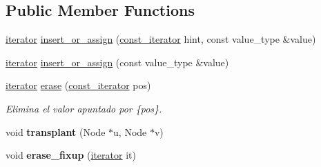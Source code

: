 \subsection*{\-Public \-Member \-Functions}
\begin{DoxyCompactItemize}
\item 
\hyperlink{classaed2_1_1map_1_1iterator}{iterator} \hyperlink{classaed2_1_1map_a2ef6723c183916276b0afc4a4c721475}{insert\-\_\-or\-\_\-assign} (\hyperlink{classaed2_1_1map_1_1const__iterator}{const\-\_\-iterator} hint, const value\-\_\-type \&value)
\item 
\hyperlink{classaed2_1_1map_1_1iterator}{iterator} \hyperlink{classaed2_1_1map_a9128a806713bcc999ebd8a97ab77e765}{insert\-\_\-or\-\_\-assign} (const value\-\_\-type \&value)
\item 
\hyperlink{classaed2_1_1map_1_1iterator}{iterator} \hyperlink{classaed2_1_1map_ad8e796bf9c9c558e5ce6b61e116253fe}{erase} (\hyperlink{classaed2_1_1map_1_1const__iterator}{const\-\_\-iterator} pos)
\begin{DoxyCompactList}\small\item\em \-Elimina el valor apuntado por \{pos\}. \end{DoxyCompactList}\item 
\hypertarget{classaed2_1_1map_a98b9f200c64ce02dfb67902ee00e375a}{void {\bfseries transplant} (\-Node $\ast$u, \-Node $\ast$v)}\label{classaed2_1_1map_a98b9f200c64ce02dfb67902ee00e375a}

\item 
\hypertarget{classaed2_1_1map_a7870c8f26e82b00d0aeb2e9f331dfec6}{void {\bfseries erase\-\_\-fixup} (\hyperlink{classaed2_1_1map_1_1iterator}{iterator} it)}\label{classaed2_1_1map_a7870c8f26e82b00d0aeb2e9f331dfec6}


\end{DoxyCompactItemize}
